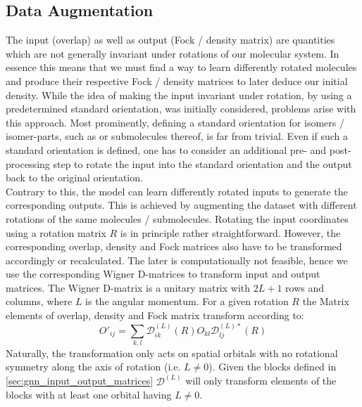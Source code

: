 \subsection{Data Augmentation}
\label{subsec:gnn_data_augmentation}
The input (overlap) as well as output (Fock / density matrix) are quantities which are not generally invariant under rotations of our molecular system. In essence this means that we must find a way to learn differently rotated molecules and produce their respective Fock / density matrices to later deduce our initial density. While the idea of making the input invariant under rotation, by using a predetermined standard orientation, was initially considered, problems arise with this approach. Most prominently, defining a standard orientation for isomers / isomer-parts, such as  or submolecules thereof, is far from trivial. Even if such a standard orientation is defined, one has to consider an additional pre- and post-processing step to rotate the input into the standard orientation and the output back to the original orientation. \\
Contrary to this, the model can learn differently rotated inputs to generate the corresponding outputs. This is achieved by augmenting the dataset with different rotations of the same molecules / submolecules. Rotating the input coordinates using a rotation matrix $R$ is in principle rather straightforward. However, the corresponding overlap, density and Fock matrices also have to be transformed accordingly or recalculated. The later is computationally not feasible, hence we use the corresponding Wigner D-matrices to transform input and output matrices. 
The Wigner D-matrix is a unitary matrix with $2L + 1$ rows and columns, where $L$ is the angular momentum. For a given rotation $R$ the Matrix elements of overlap, density and Fock matrix transform according to:
\begin{equation}
    \label{eq:wigner_d_transform}
    O'_{ij} = \sum_{k,l} \mathcal{D}^{(L)}_{ik}(R) O_{kl} \mathcal{D}^{(L)*}_{lj}(R)
\end{equation}
Naturally, the transformation only acts on spatial orbitals with no rotational symmetry along the axis of rotation (i.e. $L \neq 0$). Given the blocks defined in \autoref{sec:gnn_input_output_matrices} $\mathcal{D}^{(L)}$ will only transform elements of the blocks with at least one orbital having $L \neq 0$. \\


